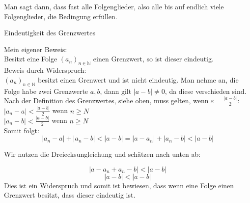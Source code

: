 \documentclass[headsepline,12pt,a4paper]{scrartcl}
\begin{document}
Man sagt dann, dass fast alle Folgenglieder, also alle bis auf endlich viele Folgenglieder, die Bedingung erfüllen. \\

\begin{center}
\item[Eindeutigkeit des Grenzwertes]
\end{center}
\item Mein eigener Beweis: \\
Besitzt eine Folge $ (a_n)_{n \in \mathbb{N}} $ einen Grenzwert, so ist dieser eindeutig.  \\

Beweis durch Widerspruch: \\

$ (a_n)_{n \in \mathbb{N}} $ besitzt einen Grenwert und ist nicht eindeutig.
Man nehme an, die Folge habe zwei Grenzwerte $a,b$, dann gilt $|a-b|\neq 0 $, da diese verschieden sind.\\

Nach der Definition des Grenzwertes, siehe oben, muss gelten, wenn $\varepsilon = \frac{|a-b|}{2} $: \\

$|a_n - a| < \frac{|a-b|}{2}$ wenn $ n \geq  N $ \\
$|a_n - b| < \frac{|a-b|}{2}$ wenn $ n \geq  N $ \\

Somit folgt: \\
$$|a_n - a| + |a_n - b| < |a-b|  = |a- a_n| + |a_n - b| < |a-b| $$

Wir nutzen die Dreiecksungleichung und schätzen nach unten ab: 

$$|a-a_n+a_n - b| < |a-b| $$
$$ |a-b| < |a-b| $$ Dies ist ein Widerspruch und somit ist bewiesen, dass wenn eine Folge einen Grenzwert besitzt, dass dieser eindeutig ist. \\





\newpage
\end{document}
